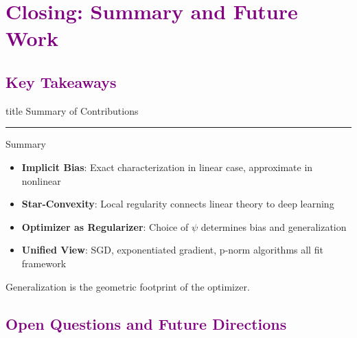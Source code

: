 \documentclass[aspectratio=169]{beamer}
\begin{document}
\section{\textbf{\textcolor{purple}{Closing: Summary and Future Work}}}

\subsection{\textbf{\textcolor{purple}{Key Takeaways}}}
\begin{frame}[plain]
    \vfill
    \centering
    \begin{beamercolorbox}[sep=8pt,center,shadow=true,rounded=true]{title}
        Summary of Contributions\par%
        \color{oxfordblue}\noindent\rule{10cm}{1pt}
    \end{beamercolorbox}
    \vfill
\end{frame}

\begin{frame}{Summary}
    \vspace{-0.2cm}
    \begin{itemize}
        \item \textbf{Implicit Bias}: Exact characterization in linear case, approximate in nonlinear
        \item \textbf{Star-Convexity}: Local regularity connects linear theory to deep learning
        \item \textbf{Optimizer as Regularizer}: Choice of $\psi$ determines bias and generalization
        \item \textbf{Unified View}: SGD, exponentiated gradient, p-norm algorithms all fit framework
    \end{itemize}
    
    \vspace{0.2cm}
    Generalization is the geometric footprint of the optimizer.
\end{frame}
\subsection{\textbf{\textcolor{purple}{Open Questions and Future Directions}}}
\end{document}
